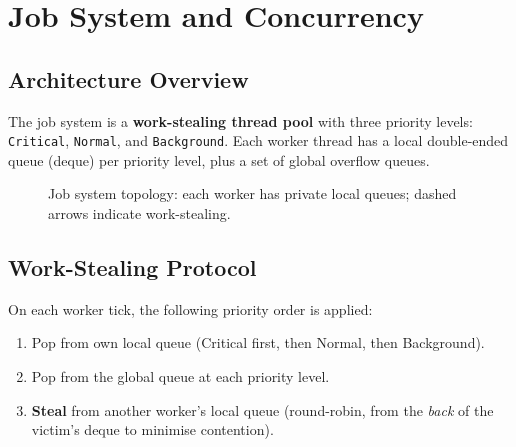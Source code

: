 \chapter{Job System and Concurrency}

\section{Architecture Overview}

The job system is a \textbf{work-stealing thread pool} with three
priority levels: \texttt{Critical}, \texttt{Normal}, and \texttt{Background}.
Each worker thread has a local double-ended queue (deque) per priority level,
plus a set of global overflow queues.

\begin{figure}[H]
\centering
{}
\caption{Job system topology: each worker has private local queues; dashed arrows indicate work-stealing.}
\end{figure}

\section{Work-Stealing Protocol}

On each worker tick, the following priority order is applied:

\begin{enumerate}
  \item Pop from own local queue (Critical first, then Normal, then Background).
  \item Pop from the global queue at each priority level.
  \item \textbf{Steal} from another worker's local queue (round-robin,
        from the \emph{back} of the victim's deque to minimise contention).
\end{enumerate}

